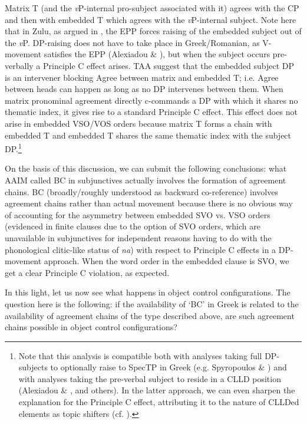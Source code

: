 \documentclass[output=paper]{langsci/langscibook}
\begin{document}
Matrix T (and the \textit{v}P-internal pro-subject associated with it) agrees with the CP and then with embedded T which agrees with the \textit{v}P-internal subject. Note here that in Zulu, as argued in \citet{Halpert2016}, the EPP forces raising of the embedded subject out of the \textit{v}P. DP-raising does not have to take place in Greek\slash Romanian, as V-movement satisfies the EPP (Alexiadou \& \citealt{Anagnostopoulou1998}), but when the subject occurs pre-verbally a Principle C effect arises. TAA suggest that the embedded subject DP is an intervener blocking Agree between matrix and embedded T; i.e. Agree between heads can happen as long as no DP intervenes between them. When matrix pronominal agreement directly c-commands a DP with which it shares no thematic index, it gives rise to a standard Principle C effect. This effect does not arise in embedded VSO/VOS orders because matrix T forms a chain with embedded T and embedded T shares the same thematic index with the subject DP.\footnote{Note that this analysis is compatible both with analyses taking full DP-subjects to optionally raise to SpecTP in Greek (e.g. Spyropoulos \& \citealt{Revithiadou2009}) and with analyses taking the pre-verbal subject to reside in a CLLD position (Alexiadou \& \citealt{Anagnostopoulou1998}, \citealt{Barbosa2009} and others). In the latter approach, we can even sharpen the explanation for the Principle C effect, attributing it to the nature of CLLDed elements as topic shifters (cf. \citealt{Frascarelli2007}).}   

On the basis of this discussion, we can submit the following conclusions: what AAIM called BC in subjunctives actually involves the formation of agreement chains. BC (broadly/roughly understood as backward co-reference) involves agreement chains rather than actual movement because there is no obvious way of accounting for the asymmetry between embedded SVO vs. VSO orders (evidenced in finite clauses due to the option of SVO orders, which are unavailable in subjunctives for independent reasons having to do with the phonological clitic-like status of \textit{na}) with respect to Principle C effects in a DP-movement approach. When the word order in the embedded clause is SVO, we get a clear Principle C violation, as expected.

In this light, let us now see what happens in object control configurations. The question here is the following: if the availability of ‘BC’ in Greek is related to the availability of agreement chains of the type described above, are such agreement chains possible in object control configurations?
\end{document}
